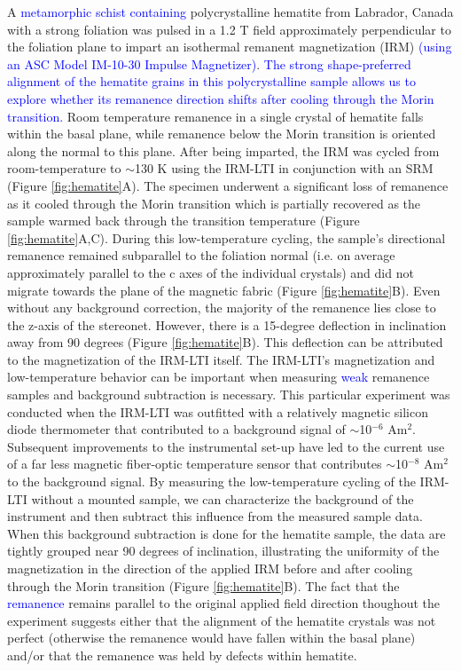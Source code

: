 \documentclass[draft,gc]{AGUTeX}
\begin{document}
\begin{article}
A \textcolor{blue}{metamorphic schist containing} polycrystalline hematite from Labrador, Canada with a strong foliation was pulsed in a 1.2 T field approximately perpendicular to the foliation plane to impart an isothermal remanent magnetization (IRM) \textcolor{blue}{(using an ASC Model IM-10-30 Impulse Magnetizer)}. \textcolor{blue}{The strong shape-preferred alignment of the hematite grains in this polycrystalline sample allows us to explore whether its remanence direction shifts after cooling through the Morin transition.} Room temperature remanence in a single crystal of hematite falls within the basal plane, while remanence below the Morin transition is oriented along the normal to this plane. After being imparted, the IRM was cycled from room-temperature to $\sim$130 K using the IRM-LTI in conjunction with an SRM (Figure \ref{fig:hematite}A). The specimen underwent a significant loss of remanence as it cooled through the Morin transition which is partially recovered as the sample warmed back through the transition temperature (Figure \ref{fig:hematite}A,C). During this low-temperature cycling, the sample's directional remanence remained subparallel to the foliation normal (i.e. on average approximately parallel to the c axes of the individual crystals) and did not migrate towards the plane of the magnetic fabric (Figure \ref{fig:hematite}B). Even without any background correction, the majority of the remanence lies close to the z-axis of the stereonet. However, there is a 15-degree deflection in inclination away from 90 degrees (Figure \ref{fig:hematite}B). This deflection can be attributed to the magnetization of the IRM-LTI itself. The IRM-LTI's magnetization and low-temperature behavior can be important when measuring \textcolor{blue}{weak} remanence samples and background subtraction is necessary. This particular experiment was conducted when the IRM-LTI was outfitted with a relatively magnetic silicon diode thermometer that contributed to a background signal of $\sim$10$^{-6}$ Am$^2$. Subsequent improvements to the instrumental set-up have led to the current use of a far less magnetic fiber-optic temperature sensor that contributes $\sim$10$^{-8}$ Am$^2$ to the background signal.  By measuring the low-temperature cycling of the IRM-LTI without a mounted sample, we can characterize the background of the instrument and then subtract this influence from the measured sample data. When this background subtraction is done for the hematite sample, the data are tightly grouped near 90 degrees of inclination, illustrating the uniformity of the magnetization in the direction of the applied IRM before and after cooling through the Morin transition (Figure \ref{fig:hematite}B). The fact that the \textcolor{blue}{remanence} remains parallel to the original applied field direction thoughout the experiment suggests either that the alignment of the hematite crystals was not perfect (otherwise the remanence would have fallen within the basal plane) and/or that the remanence was held by defects within hematite.


\end{article}
\end{document}
